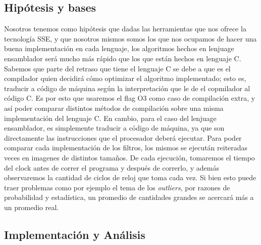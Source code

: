 \documentclass[a4paper]{article}
\begin{document}
\subsection{Hipótesis y bases}
Nosotros tenemos como hipótesis que dadas las herramientas que nos ofrece la tecnología SSE, y que nosotros mismos somos los que nos
ocupamos de hacer una buena implementación en cada lenguaje, los algoritmos hechos en lenjuage ensamblador será mucho más rápido
que los que están hechos en lenguaje C. Sabemos que parte del retraso que tiene el lenguaje C se debe a que es el compilador quien decidirá cómo
optimizar el algoritmo implementado; esto es, traducir a código de máquina según la interpretación que le de el copmilador al código C. Es por esto 
que usaremos el flag O3 como caso de compilación extra, y así poder comparar distintos métodos de compilación sobre una misma 
implementación del lenguaje C.
En cambio, para el caso del lenjuage ensamblador, es simplemente traducir a código de máquina, ya que son directamente las instrucciones
que el procesador deberá ejecutar.
\newline
Para poder comparar cada implementación de los filtros, los mismos se ejecután reiteradas veces en imagenes de distintos tamaños.
De cada ejecución, tomaremos el tiempo del clock antes de correr el programa y después de correrlo, y además observaremos
la cantidad de ciclos de reloj que toma cada vez. Si bien esto puede traer problemas como por ejemplo el tema de los \textit{outliers},
por razones de probabilidad y estadística, un promedio de cantidades grandes se acercará más a un promedio real.

\subsection{Implementación y Análisis}
\end{document}
